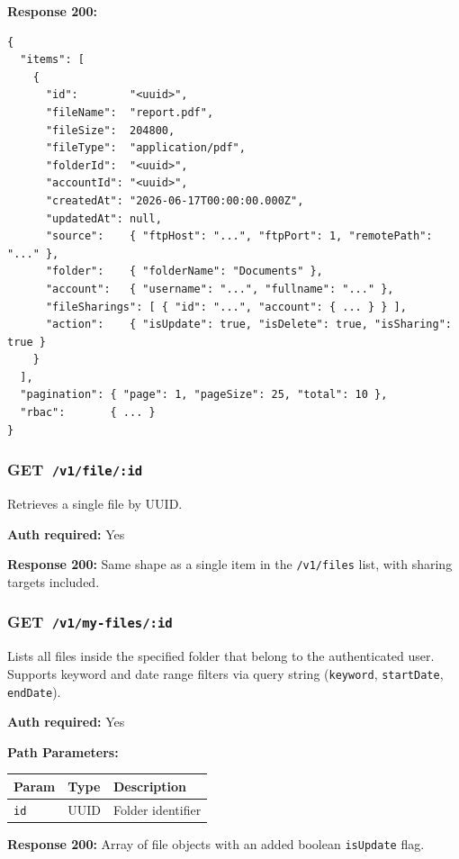 \documentclass[12pt,a4paper]{article}
\newcommand{\httpget}[1]{%
  \colorbox{getcolor!20}{\textcolor{getcolor}{\textbf{\small GET}}}~\texttt{#1}%
}
\begin{document}
\textbf{Response 200:}
\begin{lstlisting}
{
  "items": [
    {
      "id":        "<uuid>",
      "fileName":  "report.pdf",
      "fileSize":  204800,
      "fileType":  "application/pdf",
      "folderId":  "<uuid>",
      "accountId": "<uuid>",
      "createdAt": "2026-06-17T00:00:00.000Z",
      "updatedAt": null,
      "source":    { "ftpHost": "...", "ftpPort": 1, "remotePath": "..." },
      "folder":    { "folderName": "Documents" },
      "account":   { "username": "...", "fullname": "..." },
      "fileSharings": [ { "id": "...", "account": { ... } } ],
      "action":    { "isUpdate": true, "isDelete": true, "isSharing": true }
    }
  ],
  "pagination": { "page": 1, "pageSize": 25, "total": 10 },
  "rbac":       { ... }
}
\end{lstlisting}

\vspace{0.5em}
\subsubsection{\httpget{/v1/file/:id}}

Retrieves a single file by UUID.

\textbf{Auth required:} Yes

\textbf{Response 200:} Same shape as a single item in the \texttt{/v1/files} list, with sharing targets included.

\vspace{0.5em}
\subsubsection{\httpget{/v1/my-files/:id}}

Lists all files inside the specified folder that belong to the authenticated user. Supports keyword and date range filters via query string (\texttt{keyword}, \texttt{startDate}, \texttt{endDate}).

\textbf{Auth required:} Yes

\textbf{Path Parameters:}

\begin{tabularx}{\linewidth}{llX}
\toprule
\textbf{Param} & \textbf{Type} & \textbf{Description} \\
\midrule
\texttt{id} & UUID & Folder identifier \\
\bottomrule
\end{tabularx}

\textbf{Response 200:} Array of file objects with an added boolean \texttt{isUpdate} flag.
\end{document}
